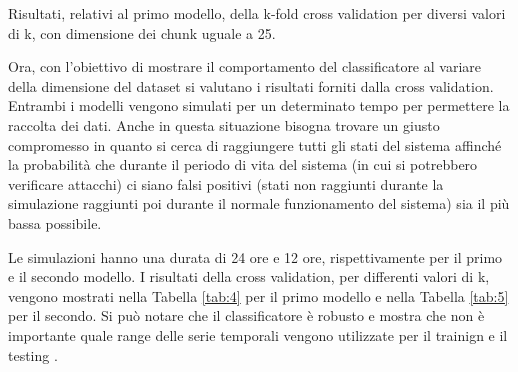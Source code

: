 \documentclass[Lau,binding=0.6cm]{sapthesis}
\begin{document}
\begin{table}
    \begin{center}
    \end{center}   
    \caption{Risultati, relativi al primo modello, della k-fold cross validation per diversi valori di k, con dimensione dei chunk uguale a 25.} 
    \label{tab:4}
    \begin{center}
    \end{center}
    \caption{Risultati, relativi al secondo modello, della k-fold cross validation per diversi valori di k, con dimensione dei chunk uguale a 80.}
    \label{tab:5}
\end{table}

Ora, con l'obiettivo di mostrare il comportamento del classificatore al variare della dimensione del dataset si valutano i risultati  forniti dalla cross validation.
Entrambi i modelli vengono simulati per un determinato tempo per permettere la raccolta dei dati. Anche in questa situazione bisogna trovare un giusto compromesso in quanto 
si cerca di raggiungere tutti gli stati del sistema affinché la probabilit\`a che durante il periodo di vita del sistema (in cui si potrebbero verificare attacchi) ci siano falsi positivi (stati non raggiunti durante la simulazione raggiunti poi durante il normale funzionamento del sistema) sia il pi\`u bassa possibile.

Le simulazioni hanno una durata di 24 ore e 12 ore, rispettivamente per il primo e il secondo modello.
I risultati della cross validation, per differenti valori di k, vengono mostrati nella Tabella \ref{tab:4} per il primo modello e nella Tabella \ref{tab:5} per il secondo.
Si pu\`o notare che il classificatore \`e robusto e mostra che non \`e importante quale range delle serie temporali vengono utilizzate per il trainign e il testing .
\end{document}
